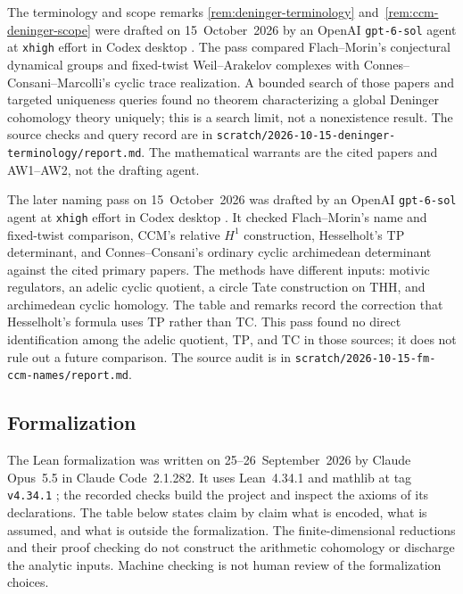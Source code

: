 \documentclass[11pt]{amsart}
\theoremstyle{plain}
\theoremstyle{definition}
\theoremstyle{remark}
\numberwithin{equation}{section}
\begin{document}
The terminology and scope remarks
\ref{rem:deninger-terminology} and~\ref{rem:ccm-deninger-scope}
were drafted on 15~October~2026 by an OpenAI
\nolinkurl{gpt-6-sol} agent at \nolinkurl{xhigh} effort in Codex
desktop \cite[\href{https://openai.com/codex/}{product description}]%
{OpenAICodex}. The pass compared Flach--Morin's conjectural
dynamical groups and fixed-twist Weil--Arakelov complexes with
Connes--Consani--Marcolli's cyclic trace realization. A bounded
search of those papers and targeted uniqueness queries found no
theorem characterizing a global Deninger cohomology theory uniquely;
this is a search limit, not a nonexistence result. The source checks
and query record are in
\nolinkurl{scratch/2026-10-15-deninger-terminology/report.md}.
The mathematical warrants are the cited papers and AW1--AW2, not
the drafting agent.

The later naming pass on 15~October~2026 was drafted by an OpenAI
\nolinkurl{gpt-6-sol} agent at \nolinkurl{xhigh} effort in Codex
desktop \cite[\href{https://openai.com/codex/}{product description}]%
{OpenAICodex}. It checked Flach--Morin's name and fixed-twist
comparison, CCM's relative $H^1$ construction, Hesselholt's
$\mathrm{TP}$ determinant, and Connes--Consani's ordinary cyclic
archimedean determinant against the cited primary papers. The
methods have different inputs: motivic regulators, an adelic cyclic
quotient, a circle Tate construction on $\mathrm{THH}$, and
archimedean cyclic homology. The table and remarks record the
correction that Hesselholt's formula uses $\mathrm{TP}$ rather than
$\mathrm{TC}$. This pass found no direct identification among the
adelic quotient, $\mathrm{TP}$, and $\mathrm{TC}$ in those sources;
it does not rule out a future comparison. The source audit is in
\nolinkurl{scratch/2026-10-15-fm-ccm-names/report.md}.

\subsection{Formalization}\label{sec:lean}
The Lean formalization was written on 25--26~September~2026 by Claude
Opus~5.5 in Claude Code~2.1.282. It uses Lean~4.34.1
\cite[pp.~625--635]{Moura2021lean} and mathlib at tag
\nolinkurl{v4.34.1}
\cite[\href{https://github.com/leanprover-community/mathlib4}
{project repository}]{Mathlib2026library}; the recorded checks build the project and inspect the
axioms of its declarations. The table below states claim by claim
what is encoded, what is assumed, and what is outside the formalization.
The finite-dimensional reductions and their proof checking do not
construct the arithmetic cohomology or discharge the analytic inputs.
Machine checking is not human review of the formalization choices.
\end{document}

